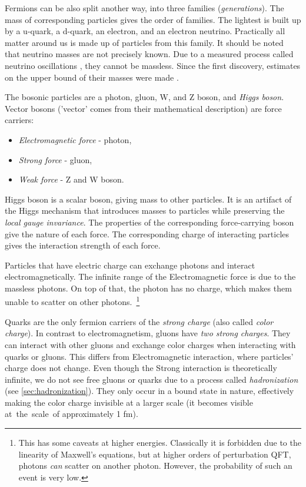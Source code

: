 Fermions can be also split another way, into three families (\emph{generations}). 
The mass of corresponding particles gives the order of families.
The lightest is built up by a u-quark, a d-quark, an electron, and an electron neutrino.
Practically all matter around us is made up of particles from this family.
It should be noted that neutrino masses are not precisely known.
Due to a measured process \cite{sadbury} called neutrino oscillations \cite{pdg}, they cannot be massless.
Since the first discovery, estimates on the upper bound of their masses were made \cite{pdg}.

The bosonic particles are a photon, gluon, W, and Z boson, and \emph{Higgs boson}. 
Vector bosons ('vector' comes from their mathematical description) are force carriers:
\begin{itemize}
    \item \emph{Electromagnetic force} - photon,
    \item \emph{Strong force} - gluon,
    \item \emph{Weak force} - Z and W boson.
\end{itemize}
Higgs boson is a scalar boson, giving mass to other particles.
It is an artifact of the Higgs mechanism that introduces masses to particles while preserving the \emph{local gauge invariance}.
The properties of the corresponding force-carrying boson give the nature of each force.
The corresponding charge of interacting particles gives the interaction strength of each force.

Particles that have electric charge can exchange photons and interact electromagnetically.
The infinite range of the Electromagnetic force is due to the massless photons.
On top of that, the photon has no charge, which makes them unable to scatter on other photons.~\footnote{This has some caveats at higher energies. Classically it is forbidden due to the linearity of Maxwell's equations, but at higher orders of perturbation QFT, photons \emph{can} scatter on another photon. However, the probability of such an event is very low.}

Quarks are the only fermion carriers of the \emph{strong charge} (also called \emph{color charge}). 
In contrast to electromagnetism, gluons have \emph{two strong charges}.
They can interact with other gluons and exchange color charges when interacting with quarks or gluons.
This differs from Electromagnetic interaction, where particles' charge does not change. 
Even though the Strong interaction is theoretically infinite, we do not see free gluons or quarks due to a process called \emph{hadronization} (see \cref{sec:hadronization}).
They only occur in a bound state in nature, effectively making the color charge invisible at a larger scale (it becomes visible at~the~scale~of approximately 1 fm).

